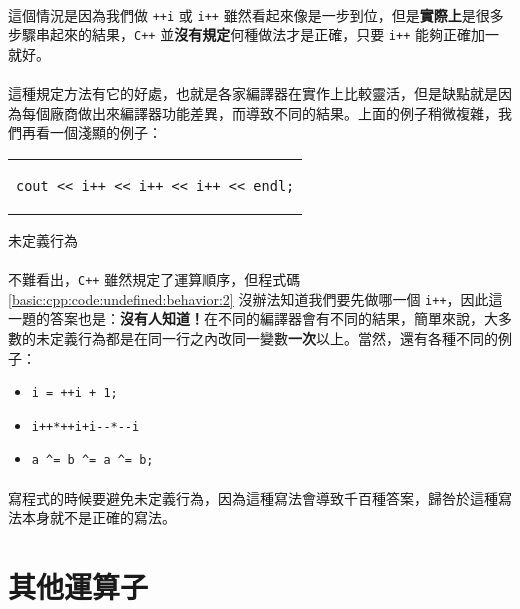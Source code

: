 \documentclass[12pt,a4paper,oneside]{report}
\begin{document}
\begin{CJK}{UTF8}{bkai}
\paragraph{}這個情況是因為我們做 \lstinline!++i! 或 \lstinline!i++! 雖然看起來像是一步到位，但是\textbf{實際上}是很多步驟串起來的結果，\texttt{C++} 並\textbf{沒有規定}何種做法才是正確，只要 \lstinline!i++! 能夠正確加一就好。
\paragraph{}這種規定方法有它的好處，也就是各家編譯器在實作上比較靈活，但是缺點就是因為每個廠商做出來編譯器功能差異，而導致不同的結果。上面的例子稍微複雜，我們再看一個淺顯的例子：

\begin{code}[h!]
\centering
\begin{tabular}{c}
\begin{lstlisting}
cout << i++ << i++ << i++ << endl;
\end{lstlisting}
\end{tabular}
\caption{未定義行為}
\label{basic:cpp:code:undefined:behavior:2}
\end{code}

\paragraph{}不難看出，\texttt{C++} 雖然規定了運算順序，但程式碼 \ref{basic:cpp:code:undefined:behavior:2} 沒辦法知道我們要先做哪一個 \lstinline!i++!，因此這一題的答案也是：\textbf{沒有人知道！}在不同的編譯器會有不同的結果，簡單來說，大多數的未定義行為都是在同一行之內改同一變數\textbf{一次}以上。當然，還有各種不同的例子：

\begin{itemize}
\item \lstinline!i = ++i + 1;!
\item \lstinline!i++*++i+i--*--i!
\item \lstinline!a ^= b ^= a ^= b;!
\end{itemize}

\paragraph{}寫程式的時候要避免未定義行為，因為這種寫法會導致千百種答案，歸咎於這種寫法本身就不是正確的寫法。

\section{其他運算子}


\end{CJK}
\end{document}
